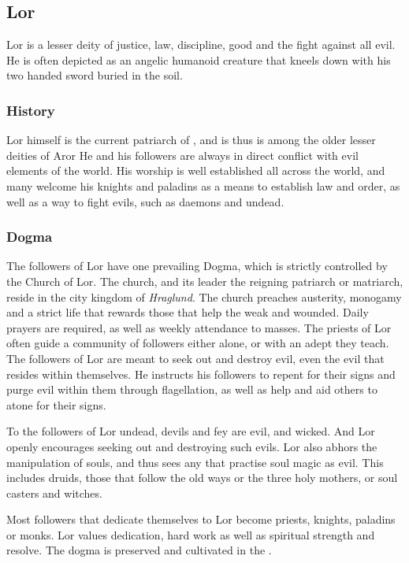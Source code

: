 \subsection{Lor}
\label{sec:Lor}

Lor is a lesser deity of justice, law, discipline, good and the fight against
all evil. He is often depicted as an angelic humanoid creature that kneels
down with his two handed sword buried in the soil.

\subsubsection{History}

Lor himself is the current patriarch of , and is thus is
among the older lesser deities of Aror He and his followers are always in
direct conflict with evil elements of the world. His worship is well
established all across the world, and many welcome his knights and paladins as
a means to establish law and order, as well as a way to fight evils, such as
daemons and undead.

\subsubsection{Dogma}

The followers of Lor have one prevailing Dogma, which is strictly controlled
by the Church of Lor. The church, and its leader the reigning patriarch or
matriarch, reside in the city kingdom of \emph{Hraglund}. The church preaches
austerity, monogamy and a strict life that rewards those that help the weak
and wounded. Daily prayers are required, as well as weekly attendance to
masses. The priests of Lor often guide a community of followers either alone,
or with an adept they teach. The followers of Lor are meant to seek out and
destroy evil, even the evil that resides within themselves. He instructs his
followers to repent for their signs and purge evil within them through
flagellation, as well as help and aid others to atone for their signs.

To the followers of Lor undead, devils and fey are evil, and wicked. And Lor
openly encourages seeking out and destroying such evils. Lor also abhors
the manipulation of souls, and thus sees any that practise soul magic as
evil. This includes druids, those that follow the old ways or the three holy
mothers, or soul casters and witches.

Most followers that dedicate themselves to Lor become priests, knights,
paladins or monks. Lor values dedication, hard work as well as spiritual
strength and resolve. The dogma is preserved and cultivated in the
.

